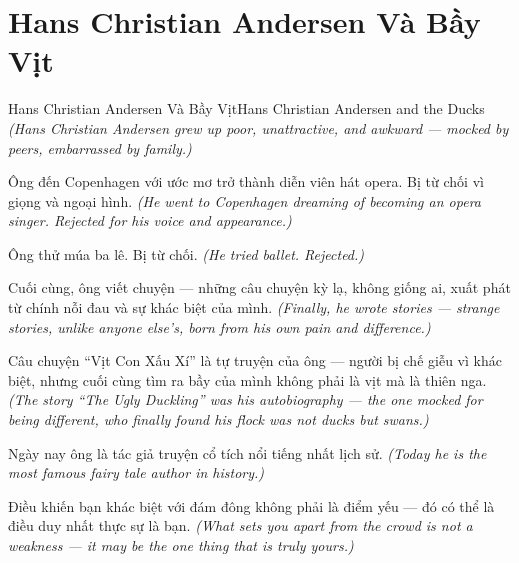 \section{Hans Christian Andersen Và Bầy Vịt}
\begin{truyen}{Hans Christian Andersen Và Bầy Vịt}{Hans Christian Andersen and the Ducks}
\textit{(Hans Christian Andersen grew up poor, unattractive, and awkward — mocked by peers, embarrassed by family.)}

Ông đến Copenhagen với ước mơ trở thành diễn viên hát opera. Bị từ chối vì giọng và ngoại hình.
\textit{(He went to Copenhagen dreaming of becoming an opera singer. Rejected for his voice and appearance.)}

Ông thử múa ba lê. Bị từ chối.
\textit{(He tried ballet. Rejected.)}

Cuối cùng, ông viết chuyện — những câu chuyện kỳ lạ, không giống ai, xuất phát từ chính nỗi đau và sự khác biệt của mình.
\textit{(Finally, he wrote stories — strange stories, unlike anyone else's, born from his own pain and difference.)}

Câu chuyện ``Vịt Con Xấu Xí'' là tự truyện của ông — người bị chế giễu vì khác biệt, nhưng cuối cùng tìm ra bầy của mình không phải là vịt mà là thiên nga.
\textit{(The story ``The Ugly Duckling'' was his autobiography — the one mocked for being different, who finally found his flock was not ducks but swans.)}

Ngày nay ông là tác giả truyện cổ tích nổi tiếng nhất lịch sử.
\textit{(Today he is the most famous fairy tale author in history.)}

\end{truyen}

\begin{baihoc}
Điều khiến bạn khác biệt với đám đông không phải là điểm yếu — đó có thể là điều duy nhất thực sự là bạn.
\textit{(What sets you apart from the crowd is not a weakness — it may be the one thing that is truly yours.)}
\end{baihoc}
\ngancach

